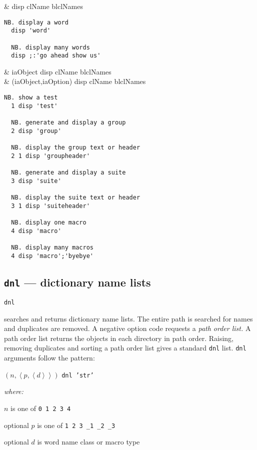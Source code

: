 \begin{wordhead}
\monad & disp clName \argsep blclNames \\
\end{wordhead}
\begin{lstlisting}[frame=single,framerule=0pt]
  NB. display a word 
  disp 'word'     

  NB. display many words 
  disp ;:'go ahead show us' 
\end{lstlisting}

\begin{wordhead}
\dyad & iaObject disp clName \argsep blclNames \\
      & (iaObject,iaOption) disp clName \argsep blclNames \\
\end{wordhead}
\begin{lstlisting}[frame=single,framerule=0pt]
  NB. show a test 
  1 disp 'test'  
  
  NB. generate and display a group 
  2 disp 'group' 

  NB. display the group text or header 
  2 1 disp 'groupheader'     

  NB. generate and display a suite 
  3 disp 'suite' 

  NB. display the suite text or header 
  3 1 disp 'suiteheader'     

  NB. display one macro
  4 disp 'macro' 
  
  NB. display many macros           
  4 disp 'macro';'byebye'    
\end{lstlisting}
  
\subsection{\texttt{dnl} --- dictionary name lists}\label{ss:dnl}

\hypertarget{il:dnl}{\texttt{dnl}} searches and returns dictionary name lists. 
The entire path is searched for names and duplicates are removed. 
A negative option code requests a \emph{path order list.} A path order list returns
 the objects in each directory in path order. 
 Raising, removing duplicates and sorting a path order list gives a 
 standard \texttt{dnl} list. \texttt{dnl} arguments follow the pattern: 

\begin{description}
\item $(n, \left\langle p, \left\langle d \right\rangle \right\rangle)$ \texttt{dnl 'str'}
\item \emph{ where:}
\begin{description}
\item $n$ is one of \verb|0 1 2 3 4 |
\item optional $p$ is one of \verb|1 2 3 _1 _2 _3 |
\item optional $d$ is word name class or macro type
\end{description}
\end{description}

